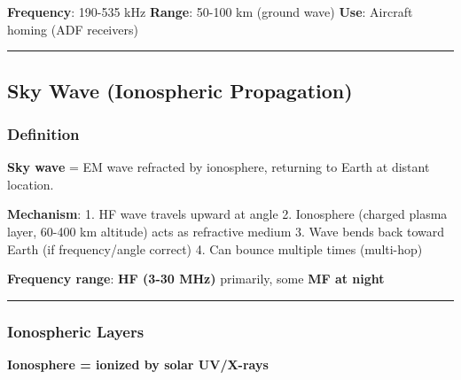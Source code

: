 \textbf{Frequency}: 190-535 kHz \textbf{Range}: 50-100 km (ground wave)
\textbf{Use}: Aircraft homing (ADF receivers)

\begin{center}\rule{0.5\linewidth}{0.5pt}\end{center}

\subsection{Sky Wave (Ionospheric
Propagation)}\label{sky-wave-ionospheric-propagation}

\subsubsection{Definition}\label{definition-1}

\textbf{Sky wave} = EM wave refracted by ionosphere, returning to Earth
at distant location.

\textbf{Mechanism}: 1. HF wave travels upward at angle 2. Ionosphere
(charged plasma layer, 60-400 km altitude) acts as refractive medium 3.
Wave bends back toward Earth (if frequency/angle correct) 4. Can bounce
multiple times (multi-hop)

\textbf{Frequency range}: \textbf{HF (3-30 MHz)} primarily, some
\textbf{MF at night}

\begin{center}\rule{0.5\linewidth}{0.5pt}\end{center}

\subsubsection{Ionospheric Layers}\label{ionospheric-layers}

\textbf{Ionosphere = ionized by solar UV/X-rays}

